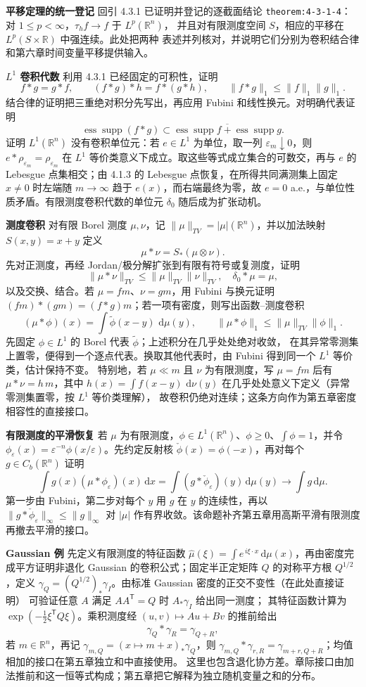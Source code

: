 \documentclass[11pt,a4paper]{ctexart}
\newcommand{\R}{\mathbb R}
\newcommand{\eps}{\varepsilon}
\newcommand{\dd}{\,\mathrm d}
\newcommand{\ess}{\operatorname*{ess}}
\newcommand{\supp}{\operatorname{supp}}
\newcommand{\planitem}[1]{\par\smallskip\noindent\textcolor{deepblue}{\textbf{#1}}\quad}
\begin{document}
\planitem{平移定理的统一登记}
回引 4.3.1 已证明并登记的逐截面结论
\texttt{theorem:4-3-1-4}：对 $1\le p<\infty$，$\tau_hf\to f$ 于 $L^p(\R^n)$，
并且对有限测度空间 $S$，相应的平移在 $L^p(S\times\R)$ 中强连续。此处把两种
表述并列核对，并说明它们分别为卷积结合律和第六章时间变量平移提供输入。

\planitem{$L^1$ 卷积代数}
利用 4.3.1 已经固定的可积性，证明
\[
f*g=g*f,\qquad (f*g)*h=f*(g*h),\qquad
\|f*g\|_1\le\|f\|_1\|g\|_1.
\]
结合律的证明把三重绝对积分先写出，再应用 Fubini 和线性换元。对明确代表证明
\[
\ess\supp(f*g)
\subset\overline{\ess\supp f+\ess\supp g}.
\]
证明 $L^1(\R^n)$ 没有卷积单位元：若 $e\in L^1$ 为单位，取一列 $\eps_m\downarrow0$，则
$e*\rho_{\eps_m}=\rho_{\eps_m}$ 在 $L^1$ 等价类意义下成立。取这些等式成立集合的可数交，再与 $e$ 的 Lebesgue 点集相交；由 4.1.3 的 Lebesgue 点恢复，在所得共同满测集上固定 $x\ne0$ 时左端随 $m\to\infty$ 趋于 $e(x)$，而右端最终为零，故 $e=0$ a.e.，与单位性质矛盾。有限测度卷积代数的单位元 $\delta_0$ 随后成为扩张动机。

\planitem{测度卷积}
对有限 Borel 测度 $\mu,\nu$，记 $\|\mu\|_{TV}=|\mu|(\R^n)$，并以加法映射
$S(x,y)=x+y$ 定义
\[
\mu*\nu=S_*(\mu\otimes\nu).
\]
先对正测度，再经 Jordan/极分解扩张到有限有符号或复测度，证明
\[
\|\mu*\nu\|_{TV}\le\|\mu\|_{TV}\|\nu\|_{TV},
\quad \delta_0*\mu=\mu,
\]
以及交换、结合。若 $\mu=fm$、$\nu=gm$，用 Fubini 与换元证明
$(fm)*(gm)=(f*g)m$；若一项有密度，则写出函数--测度卷积
\[
(\mu*\phi)(x)=\int\widetilde\phi(x-y)\,\dd\mu(y),\qquad
\|\mu*\phi\|_1\le\|\mu\|_{TV}\|\phi\|_1.
\]
先固定 $\phi\in L^1$ 的 Borel 代表 $\widetilde\phi$；上述积分在几乎处处绝对收敛，
在其异常零测集上置零，便得到一个逐点代表。换取其他代表时，由 Fubini 得到同一个
$L^1$ 等价类，估计保持不变。
特别地，若 $\mu\ll m$ 且 $\nu$ 为有限测度，写 $\mu=fm$ 后有
$\mu*\nu=h\,m$，其中 $h(x)=\int f(x-y)\,\dd\nu(y)$ 在几乎处处意义下定义（异常
零测集置零，按 $L^1$ 等价类理解），
故卷积仍绝对连续；这条方向作为第五章密度相容性的直接接口。

\planitem{有限测度的平滑恢复}
若 $\mu$ 为有限测度，$\phi\in L^1(\R^n)$、$\phi\ge0$、$\int\phi=1$，并令
$\phi_\eps(x)=\eps^{-n}\phi(x/\eps)$。先约定反射核
$\check\phi(x)=\phi(-x)$，再对每个 $g\in C_b(\R^n)$ 证明
\[
\int g(x)(\mu*\phi_\eps)(x)\dd x
=\int(g*\check\phi_\eps)(y)\dd\mu(y)
\longrightarrow\int g\dd\mu.
\]
第一步由 Fubini，第二步对每个 $y$ 用 $g$ 在 $y$ 的连续性，再以
$\|g*\check\phi_\eps\|_\infty\le\|g\|_\infty$ 对 $|\mu|$ 作有界收敛。该命题补齐第五章用高斯平滑有限测度再撤去平滑的接口。

\planitem{Gaussian 例}
先定义有限测度的特征函数
$\widehat\mu(\xi)=\int e^{\,i\xi\cdot x}\dd\mu(x)$，再由密度完成平方证明非退化
Gaussian 的卷积公式；固定半正定矩阵 $Q$ 的对称平方根 $Q^{1/2}$，定义
$\gamma_Q=(Q^{1/2})_*\gamma_I$。由标准 Gaussian 密度的正交不变性（在此处直接证明）
可验证任意 $A$ 满足 $AA^{\mathsf T}=Q$ 时 $A_*\gamma_I$ 给出同一测度；
其特征函数计算为 $\exp(-\tfrac12\xi^{\mathsf T}Q\xi)$。乘积测度经
$(u,v)\mapsto Au+Bv$ 的推前给出
\[
\gamma_Q*\gamma_R=\gamma_{Q+R},
\]
若 $m\in\R^n$，再记 $\gamma_{m,Q}=(x\mapsto m+x)_*\gamma_Q$，则
$\gamma_{m,Q}*\gamma_{r,R}=\gamma_{m+r,Q+R}$；均值相加的接口在第五章独立和中直接使用。
这里也包含退化协方差。章际接口由加法推前和这一恒等式构成；第五章把它解释为独立随机变量之和的分布。
\end{document}
